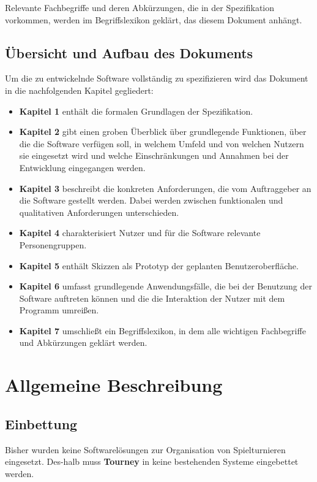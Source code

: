 \documentclass[11pt]{article}
\begin{document}
Relevante Fachbegriffe und deren Abkürzungen, die in der Spezifikation vorkommen, werden im Begriffslexikon geklärt, das diesem Dokument anhängt.

\subsection{Übersicht und Aufbau des Dokuments}

Um die zu entwickelnde Software vollständig zu spezifizieren wird das Dokument in die nachfolgenden Kapitel gegliedert:
\begin{itemize}
	\item[] \textbf{Kapitel 1} enthält die formalen Grundlagen der Spezifikation.
	\item[] \textbf{Kapitel 2} gibt einen groben Überblick über grundlegende Funktionen, über die die Software verfügen soll, in welchem Umfeld und von welchen Nutzern sie eingesetzt wird und welche Einschränkungen und Annahmen bei der Entwicklung eingegangen werden.
	\item[] \textbf{Kapitel 3} beschreibt die konkreten Anforderungen, die vom Auftraggeber an die Software gestellt werden. Dabei werden zwischen funktionalen und qualitativen Anforderungen unterschieden.
	\item[] \textbf{Kapitel 4} charakterisiert Nutzer und für die Software relevante Personengruppen.
	\item[] \textbf{Kapitel 5} enthält Skizzen als Prototyp der geplanten Benutzeroberfläche.
	\item[] \textbf{Kapitel 6} umfasst grundlegende Anwendungsfälle, die bei der Benutzung der Software auftreten können und die die Interaktion der Nutzer mit dem Programm umreißen.
	\item[] \textbf{Kapitel 7} umschließt ein Begriffslexikon, in dem alle wichtigen Fachbegriffe und Abkürzungen geklärt werden.
\end{itemize}

\newpage

\section{Allgemeine Beschreibung}

\subsection{Einbettung}

Bisher wurden keine Softwarelösungen zur Organisation von Spielturnieren eingesetzt. Des-halb muss \textbf{Tourney} in keine bestehenden Systeme eingebettet werden.
\end{document}

